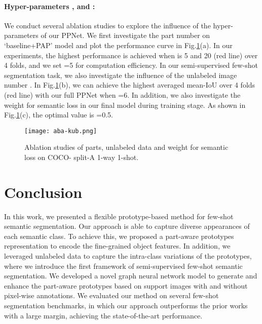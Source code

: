 \documentclass[runningheads]{llncs}
\begin{document}
\paragraph{{\rm \textbf{Hyper-parameters ,  and :}}} 
We conduct several ablation studies to explore the influence of the hyper-parameters of our PPNet. We first investigate the part number  on `baseline+PAP' model and plot the performance curve in Fig.\ref{aba-ku}(a). In our experiments, the highest performance is achieved when  is 5 and 20 (red line) over 4 folds, and we set =5 for computation efficiency. In our semi-supervised few-shot segmentation task, we also investigate the influence of the unlabeled image number . In Fig.\ref{aba-ku}(b), we can achieve the highest averaged mean-IoU over 4 folds (red line) with our full PPNet when =6. In addition, we also investigate the weight  for semantic loss  in our final model during training stage. As shown in Fig.\ref{aba-ku}(c), the optimal value is =0.5.
\begin{figure}[t]
    \centering
    \texttt{[image: aba-kub.png]}
    \caption{{\small Ablation studies of  parts,  unlabeled data and weight  for semantic loss on COCO- split-A 1-way 1-shot.}}
    \label{aba-ku}
\end{figure}


\section{Conclusion}
In this work, we presented a flexible prototype-based method for few-shot semantic segmentation. Our approach is able to capture diverse appearances of each semantic class. To achieve this, we proposed a part-aware prototypes representation to encode the fine-grained object features. In addition, we leveraged unlabeled data to capture the intra-class variations of the prototypes, where we introduce the first framework of semi-supervised few-shot semantic segmentation. We developed a novel graph neural network model to generate and enhance the part-aware prototypes based on support images with and without pixel-wise annotations. We evaluated our method on several few-shot segmentation benchmarks, in which our approach outperforms the prior works with a large margin, achieving the state-of-the-art performance.



\end{document}
